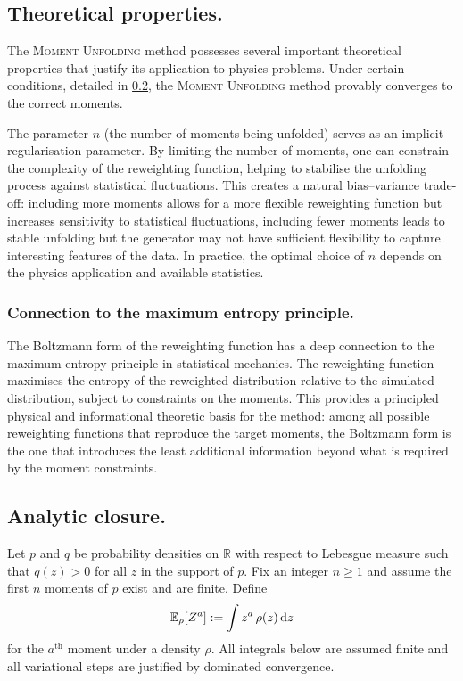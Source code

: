    \subsection{Theoretical properties.}
        The \textsc{Moment Unfolding} method possesses several important theoretical properties that justify its application to physics problems.
        Under certain conditions, detailed in \cref{subsec:theoretical-properties.analytic-closure}, the \textsc{Moment Unfolding} method provably converges to the correct moments.

        The parameter $n$ (the number of moments being unfolded) serves as an implicit regularisation parameter.
        By limiting the number of moments, one can constrain the complexity of the reweighting function, helping to stabilise the unfolding process against statistical fluctuations.
        This creates a natural bias--variance trade-off: including more moments allows for a more flexible reweighting function but increases sensitivity to statistical fluctuations, including fewer moments leads to stable unfolding but the generator may not have sufficient flexibility to capture interesting features of the data.
        In practice, the optimal choice of $n$ depends on the physics application and available statistics.
        
        \subsubsection{Connection to the maximum entropy principle.}
            The Boltzmann form of the reweighting function has a deep connection to the maximum entropy principle in statistical mechanics.
            The reweighting function maximises the entropy of the reweighted distribution relative to the simulated distribution, subject to constraints on the moments.
            This provides a principled physical and informational theoretic basis for the method: among all possible reweighting functions that reproduce the target moments, the Boltzmann form is the one that introduces the least additional information beyond what is required by the moment constraints.
    \subsection{Analytic closure.}
    \label{subsec:theoretical-properties.analytic-closure}

        Let $p$ and $q$ be probability densities on $\mathbb{R}$ with respect to Lebesgue measure such that $q(z)>0$ for all $z$ in the support of $p$. Fix an integer $n\ge 1$ and assume the first $n$ moments of $p$ exist and are finite. Define
        \[
            \operatorname{\mathbb{E}}_{\rho}[Z^a] := \int z^a \,\rho(z)\,\dd z
        \]
        for the $a^{\text{th}}$ moment under a density $\rho$. All integrals below are assumed finite and all variational steps are justified by dominated convergence.


